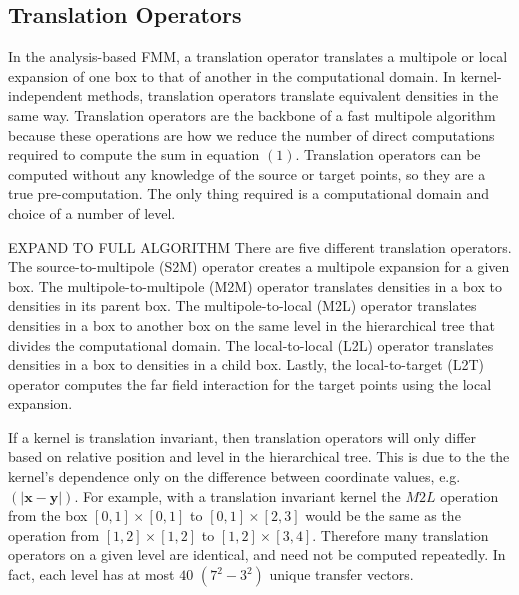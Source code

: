 \documentclass[11pt, oneside]{article}   	%
\begin{document}

\subsection{Translation Operators}
In the analysis-based FMM, a translation operator translates a multipole or local expansion of one box to that of another in the computational domain. In kernel-independent methods, translation operators translate equivalent densities in the same way. Translation operators are the backbone of a fast multipole algorithm because these operations are how we reduce the number of direct computations required to compute the sum in equation $(1)$. Translation operators can be computed without any knowledge of the source or target points, so they are a true pre-computation. The only thing required is a computational domain and choice of a number of level.

EXPAND TO FULL ALGORITHM
There are five different translation operators. The source-to-multipole (S2M) operator creates a multipole expansion for a given box. The multipole-to-multipole (M2M) operator translates densities in a box to densities in its parent box. The multipole-to-local (M2L) operator translates densities in a box to another box on the same level in the hierarchical tree that divides the computational domain. The local-to-local (L2L) operator translates densities in a box to densities in a child box. Lastly, the local-to-target (L2T) operator computes the far field interaction for the target points using the local expansion.

If a kernel is translation invariant, then translation operators will only differ based on relative position and level in the hierarchical tree. This is due to the the kernel's dependence only on the difference between coordinate values, e.g. $(|\mathbf{x}-\mathbf{y}|)$. For example, with a translation invariant kernel the $M2L$ operation from the box $[0,1]\times[0,1]$ to $[0,1]\times[2,3]$ would be the same as the operation from $[1,2]\times[1,2]$ to $[1,2]\times[3,4]$. Therefore many translation operators on a given level are identical, and need not be computed repeatedly. In fact, each level has at most $40$ $(7^2-3^2)$ unique transfer vectors.
\end{document}
